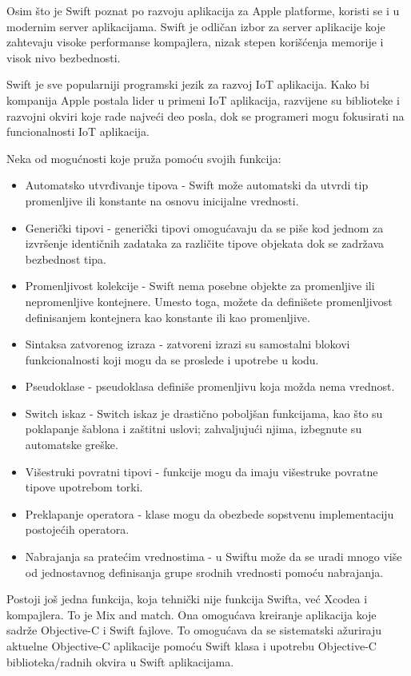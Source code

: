 \documentclass[a4paper]{article}
\begin{document}
Osim što je Swift poznat po razvoju aplikacija za Apple platforme, koristi se i u modernim server aplikacijama. Swift je odličan izbor za server aplikacije koje zahtevaju visoke performanse kompajlera, nizak stepen korišćenja memorije i visok nivo bezbednosti.

Swift je sve popularniji programski jezik za razvoj IoT aplikacija. Kako bi kompanija Apple postala lider u primeni IoT aplikacija, razvijene su biblioteke i razvojni okviri koje rade najveći deo posla, dok se programeri mogu fokusirati na funcionalnosti IoT aplikacija.

Neka od mogućnosti koje pruža pomoću svojih funkcija:
\begin{itemize}
\item Automatsko utvrđivanje tipova - Swift može automatski da utvrdi tip promenljive ili konstante na osnovu inicijalne
vrednosti. 
\item Generički tipovi - generički tipovi omogućavaju da se piše kod jednom za izvršenje identičnih
zadataka za različite tipove objekata dok se zadržava bezbednost tipa. 
\item Promenljivost kolekcije - Swift nema posebne objekte za promenljive ili nepromenljive kontejnere. Umesto
toga, možete da definišete promenljivost definisanjem kontejnera kao konstante
ili kao promenljive.
\item Sintaksa zatvorenog izraza - zatvoreni izrazi su samostalni blokovi funkcionalnosti koji mogu da se proslede i upotrebe u kodu.
\item Pseudoklase - pseudoklasa definiše promenljivu koja možda nema vrednost.
\item Switch iskaz - Switch iskaz je drastično poboljšan funkcijama, kao što su poklapanje šablona i
zaštitni uslovi; zahvaljujući njima, izbegnute su automatske greške.
\item Višestruki povratni tipovi - funkcije mogu da imaju višestruke povratne tipove upotrebom torki. 
\item Preklapanje operatora - klase mogu da obezbede sopstvenu implementaciju postojećih operatora. 
\item Nabrajanja sa pratećim vrednostima - u Swiftu može da se uradi mnogo više od jednostavnog definisanja grupe srodnih vrednosti pomoću nabrajanja.
\end{itemize}

Postoji još jedna funkcija, koja tehnički nije
funkcija Swifta, već Xcodea i kompajlera. To je Mix and match. Ona omogućava kreiranje aplikacija koje sadrže Objective-C i Swift fajlove. To omogućava da se sistematski ažuriraju aktuelne Objective-C aplikacije pomoću Swift klasa i upotrebu Objective-C biblioteka/radnih okvira u Swift aplikacijama.
\end{document}
